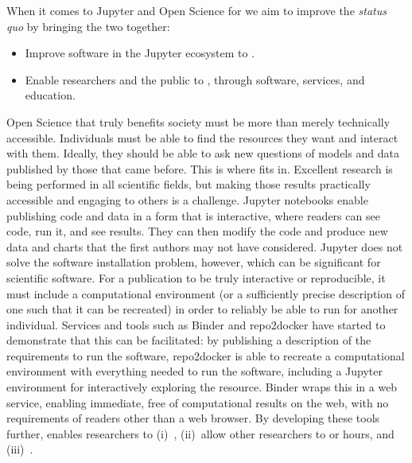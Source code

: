 When it comes to Jupyter and Open Science for  we aim to improve the
\textit{status quo} by bringing the two together:

\begin{itemize}
\item Improve software in the Jupyter ecosystem to .
\item Enable researchers and the public to , through software, services, and education.
\end{itemize}


Open Science that truly benefits society must be more than merely
technically accessible.  Individuals must be able to find the
resources they want and interact with them.  Ideally, they should be
able to ask new questions of models and data published by those that
came before.  This is where \TheProject fits in.  Excellent research
is being performed in all scientific fields, but making those results
practically accessible and engaging to others is a challenge.
Jupyter notebooks enable publishing code and data in a form that is
interactive, where readers can see code, run it, and see results.
They can then modify the code and produce new data and charts that the
first authors may not have considered.  Jupyter does not solve the
software installation problem, however, which can be significant for
scientific software.  For a publication to be truly interactive or
reproducible, it must include a computational environment (or a
sufficiently precise description of one such that it can be recreated)
in order to reliably be able to run for another individual.  Services
and tools such as Binder and repo2docker have started to demonstrate
that this can be facilitated: by
publishing a description of the requirements to run the software,
repo2docker is able to recreate a computational environment with
everything needed to run the software, including a Jupyter
environment for interactively exploring the resource.  Binder wraps
this in a web service, enabling immediate, free  of
computational results on the web, with no requirements of readers
other than a web browser.
By developing these tools further, \TheProject enables researchers to
(i)~,
(ii)~allow other researchers to  or hours,
and (iii)~.

